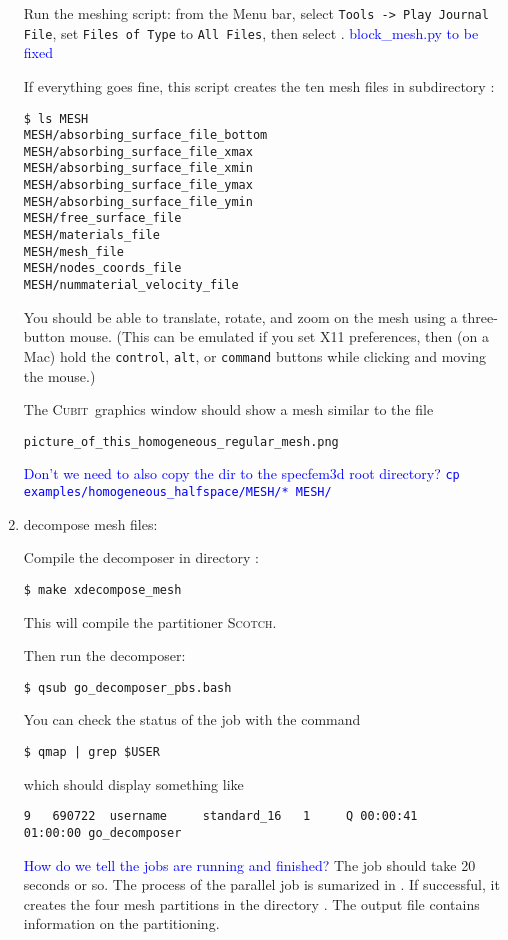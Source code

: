 \documentclass[10pt,fleqn,letterpaper]{article}
\newcommand{\cubit}{\textsc{Cubit}}
\newcommand{\blue}[1]{\textcolor{blue}{#1}}
\begin{document}
\begin{enumerate}
Run the meshing script: from the Menu bar, select \verb+Tools -> Play Journal File+, set \verb+Files of Type+ to \verb+All Files+, then select .
\blue{block\_mesh.py to be fixed}

If everything goes fine, this script creates the ten mesh files in subdirectory :
\begin{lstlisting}
$ ls MESH
MESH/absorbing_surface_file_bottom
MESH/absorbing_surface_file_xmax
MESH/absorbing_surface_file_xmin
MESH/absorbing_surface_file_ymax
MESH/absorbing_surface_file_ymin
MESH/free_surface_file
MESH/materials_file
MESH/mesh_file
MESH/nodes_coords_file
MESH/nummaterial_velocity_file
\end{lstlisting}

You should be able to translate, rotate, and zoom on the mesh using a three-button mouse. (This can be emulated if you set X11 preferences, then (on a Mac) hold the \verb+control+, \verb+alt+, or \verb+command+ buttons while clicking and moving the mouse.)

The \cubit\ graphics window should show a mesh similar to the file
\begin{verbatim}
picture_of_this_homogeneous_regular_mesh.png
\end{verbatim}
\blue{Don't we need to also copy the  dir to the specfem3d root directory? \texttt{cp examples/homogeneous\_halfspace/MESH/* MESH/}}

\item decompose mesh files:

Compile the decomposer in directory :
\begin{lstlisting}
$ make xdecompose_mesh
\end{lstlisting}
%
This will compile the partitioner \textsc{Scotch}.

Then run the decomposer:
\begin{lstlisting}
$ qsub go_decomposer_pbs.bash
\end{lstlisting}
%
You can check the status of the job with the command
%
\begin{lstlisting}
$ qmap | grep $USER
\end{lstlisting}
%
which should display something like 
\begin{lstlisting}
9   690722  username     standard_16   1     Q 00:00:41     01:00:00 go_decomposer
\end{lstlisting}
\blue{How do we tell the jobs are running and finished?} The job should take 20 seconds or so. The process of the parallel job is sumarized in . If successful, it creates the four mesh partitions  in the directory . The output file  contains information on the partitioning.


\end{enumerate}
\end{document}
